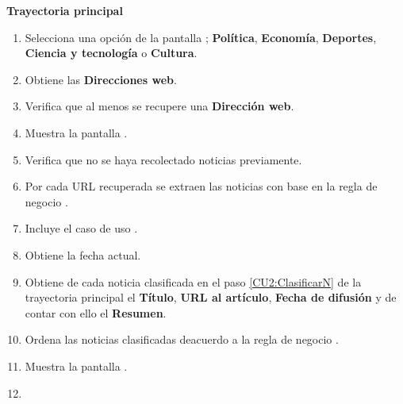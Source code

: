 \begin{large}
	\textbf{Trayectoria principal}\\
\end{large}	

\begin{enumerate}[1.]

	
	\item \actor Selecciona una opción de la pantalla ; \textbf{Política}, \textbf{Economía}, \textbf{Deportes}, \textbf{Ciencia y tecnología} o \textbf{Cultura}. 
	
	\item \sistema Obtiene las \textbf{Direcciones web}.
	
	\item \sistema Verifica que al menos se recupere una \textbf{Dirección web}. 

	\item \sistema Muestra la pantalla . 	

	\item \sistema Verifica que no se haya recolectado noticias previamente. 

	\item \sistema Por cada URL recuperada se extraen las noticias con base en la regla de negocio . 

	\item \label{CU1:BuscarN}\sistema Incluye el caso de uso .

	\item \sistema Obtiene la fecha actual.

	\item \sistema Obtiene de cada noticia clasificada en el paso \ref{CU2:ClasificarN} de la trayectoria principal el \textbf{Título}, \textbf{URL al artículo}, \textbf{Fecha de difusión} y de contar con ello el \textbf{Resumen}.

	\item \sistema Ordena las noticias clasificadas deacuerdo a la regla de negocio .

	\item \sistema \label{CU1:NoticiasR} Muestra la pantalla .

	\item \finCU	

\end{enumerate}



